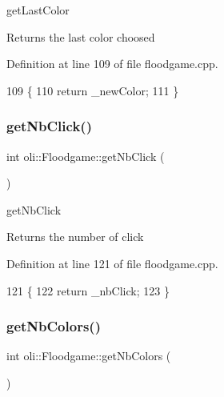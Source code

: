 get\+Last\+Color 

\begin{DoxyReturn}{Returns}
the last color choosed 
\end{DoxyReturn}


Definition at line 109 of file floodgame.\+cpp.


\begin{DoxyCode}
109                              \{
110     \textcolor{keywordflow}{return} \_newColor;
111 \}
\end{DoxyCode}
\hypertarget{classoli_1_1_floodgame_aae08dd4e048b1521797c44a68d08f250}{}\label{classoli_1_1_floodgame_aae08dd4e048b1521797c44a68d08f250} 
\subsubsection{\texorpdfstring{get\+Nb\+Click()}{getNbClick()}}
{\footnotesize\ttfamily int oli\+::\+Floodgame\+::get\+Nb\+Click (\begin{DoxyParamCaption}{ }\end{DoxyParamCaption})}



get\+Nb\+Click 

\begin{DoxyReturn}{Returns}
the number of click 
\end{DoxyReturn}


Definition at line 121 of file floodgame.\+cpp.


\begin{DoxyCode}
121                          \{
122     \textcolor{keywordflow}{return} \_nbClick;
123 \}
\end{DoxyCode}
\hypertarget{classoli_1_1_floodgame_a6ffeda1d46639b093de8892b45e7bf06}{}\label{classoli_1_1_floodgame_a6ffeda1d46639b093de8892b45e7bf06} 
\subsubsection{\texorpdfstring{get\+Nb\+Colors()}{getNbColors()}}
{\footnotesize\ttfamily int oli\+::\+Floodgame\+::get\+Nb\+Colors (\begin{DoxyParamCaption}{ }\end{DoxyParamCaption})}



